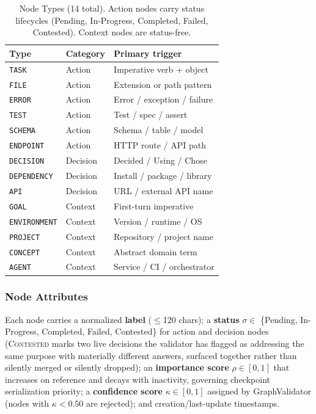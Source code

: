 \documentclass[journal]{IEEEtran}
\begin{document}
\begin{table}[t]
  \centering
  \caption{Node Types (14 total). Action nodes carry status
  lifecycles (Pending, In-Progress, Completed, Failed,
  Contested). Context nodes are status-free.}
  \label{tab:nodetypes}
  \renewcommand{\arraystretch}{1.15}
  \begin{tabular}{@{}p{2.4cm}p{1.7cm}p{3.5cm}@{}}
    \toprule
    \textbf{Type} & \textbf{Category} & \textbf{Primary trigger} \\
    \midrule
    \texttt{TASK}       & Action    & Imperative verb + object \\
    \texttt{FILE}       & Action    & Extension or path pattern \\
    \texttt{ERROR}      & Action    & Error / exception / failure \\
    \texttt{TEST}       & Action    & Test / spec / assert \\
    \texttt{SCHEMA}     & Action    & Schema / table / model \\
    \texttt{ENDPOINT}   & Action    & HTTP route / API path \\
    \midrule
    \texttt{DECISION}   & Decision  & Decided / Using / Chose \\
    \texttt{DEPENDENCY} & Decision  & Install / package / library \\
    \texttt{API}        & Decision  & URL / external API name \\
    \midrule
    \texttt{GOAL}       & Context   & First-turn imperative \\
    \texttt{ENVIRONMENT}& Context   & Version / runtime / OS \\
    \texttt{PROJECT}    & Context   & Repository / project name \\
    \texttt{CONCEPT}    & Context   & Abstract domain term \\
    \texttt{AGENT}      & Context   & Service / CI / orchestrator \\
    \bottomrule
  \end{tabular}
\end{table}

\subsubsection{Node Attributes}
Each node carries a normalized \textbf{label}
($\leq$120 chars); a \textbf{status}
$\sigma \in$ \{Pending, In-Progress, Completed, Failed,
Contested\} for action and decision nodes (\textsc{Contested}
marks two live decisions the validator has flagged as
addressing the same purpose with materially different
answers, surfaced together rather than silently merged or
silently dropped); an \textbf{importance score}
$\rho \in [0,1]$ that increases on reference and decays with
inactivity, governing checkpoint serialization priority; a
\textbf{confidence score} $\kappa \in [0,1]$ assigned by
GraphValidator (nodes with $\kappa < 0.50$ are rejected); and
creation/last-update timestamps.
\end{document}
